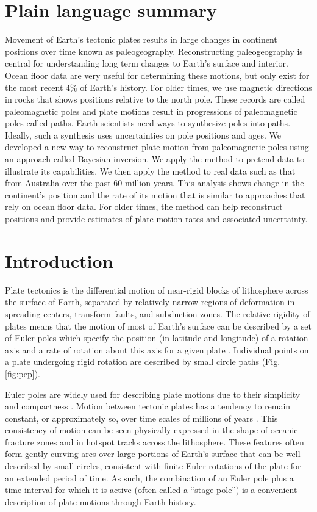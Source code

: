\documentclass[11pt,letterpaper]{article}
\begin{document}
\section*{Plain language summary}
Movement of Earth's tectonic plates results in large changes in continent positions over time known as paleogeography. Reconstructing paleogeography is central for understanding long term changes to Earth's surface and interior. Ocean floor data are very useful for determining these motions, but only exist for the most recent 4$\%$ of Earth's history. For older times, we use magnetic directions in rocks that shows positions relative to the north pole. These records are called paleomagnetic poles and plate motions result in progressions of paleomagnetic poles called paths. Earth scientists need ways to synthesize poles into paths. Ideally, such a synthesis uses uncertainties on pole positions and ages. We developed a new way to reconstruct plate motion from paleomagnetic poles using an approach called Bayesian inversion. We apply the method to pretend data to illustrate its capabilities. We then apply the method to real data such as that from Australia over the past 60 million years. This analysis shows change in the continent's position and the rate of its motion that is similar to approaches that rely on ocean floor data. For older times, the method can help reconstruct positions and provide estimates of plate motion rates and associated uncertainty. 

\section*{Introduction}

Plate tectonics is the differential motion of near-rigid blocks of lithosphere across the surface of Earth, separated by relatively narrow regions of deformation in spreading centers, transform faults, and subduction zones. The relative rigidity of plates means that the motion of most of Earth's surface can be described by a set of Euler poles which specify the position (in latitude and longitude) of a rotation axis and a rate of rotation about this axis for a given plate \citep[cf.][]{Cox2009a}. Individual points on a plate undergoing rigid rotation are described by small circle paths (Fig. \ref{fig:pep}).

Euler poles are widely used for describing plate motions due to their simplicity and compactness \citep[e.g.][]{DeMets2010a, Argus2011a}. Motion between tectonic plates has a tendency to remain constant, or approximately so, over time scales of millions of years \citep[e.g.][]{Iaffaldano2012a, Muller2016a}. This consistency of motion can be seen physically expressed in the shape of oceanic fracture zones and in hotspot tracks across the lithosphere. These features often form gently curving arcs over large portions of Earth's surface that can be well described by small circles, consistent with finite Euler rotations of the plate for an extended period of time. As such, the combination of an Euler pole plus a time interval for which it is active (often called a ``stage pole'') is a convenient description of plate motions through Earth history.
\end{document}
